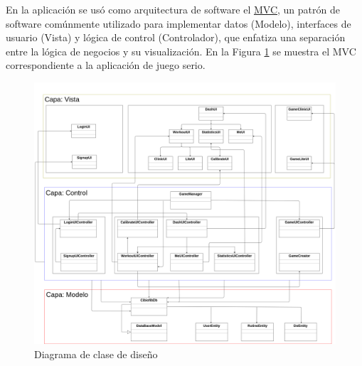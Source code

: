 En la aplicación se usó como arquitectura de software el \hyperlink{page: abbidx}{MVC}, un patrón de software comúnmente utilizado para implementar datos (Modelo), interfaces de usuario (Vista) y lógica de control (Controlador), que enfatiza una separación entre la lógica de negocios y su visualización. En la Figura \ref{fig: software-architecture} se muestra el MVC correspondiente a la aplicación de juego serio.

\begin{figure}[ht]
    \centering
    \includegraphics[scale=0.18]{images/software-architecture.png}
    \caption{Diagrama de clase de diseño}
    \label{fig: software-architecture}
\end{figure}




